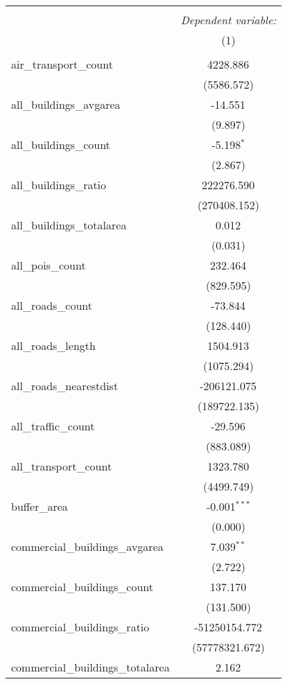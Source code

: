 \begin{table}[!htbp] \centering
\begin{tabular}{@{\extracolsep{5pt}}lc}
\\[-1.8ex]\hline
\hline \\[-1.8ex]
& \multicolumn{1}{c}{\textit{Dependent variable:}} \
\cr \cline{1-2}
\\[-1.8ex] & (1) \\
\hline \\[-1.8ex]
 air_transport_count & 4228.886$^{}$ \\
  & (5586.572) \\
 all_buildings_avgarea & -14.551$^{}$ \\
  & (9.897) \\
 all_buildings_count & -5.198$^{*}$ \\
  & (2.867) \\
 all_buildings_ratio & 222276.590$^{}$ \\
  & (270408.152) \\
 all_buildings_totalarea & 0.012$^{}$ \\
  & (0.031) \\
 all_pois_count & 232.464$^{}$ \\
  & (829.595) \\
 all_roads_count & -73.844$^{}$ \\
  & (128.440) \\
 all_roads_length & 1504.913$^{}$ \\
  & (1075.294) \\
 all_roads_nearestdist & -206121.075$^{}$ \\
  & (189722.135) \\
 all_traffic_count & -29.596$^{}$ \\
  & (883.089) \\
 all_transport_count & 1323.780$^{}$ \\
  & (4499.749) \\
 buffer_area & -0.001$^{***}$ \\
  & (0.000) \\
 commercial_buildings_avgarea & 7.039$^{**}$ \\
  & (2.722) \\
 commercial_buildings_count & 137.170$^{}$ \\
  & (131.500) \\
 commercial_buildings_ratio & -51250154.772$^{}$ \\
  & (57778321.672) \\
 commercial_buildings_totalarea & 2.162$^{}$ \\

\end{tabular}
\end{table}
